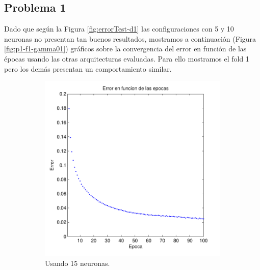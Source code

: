 \documentclass[informe.tex]{subfiles}
\begin{document}
    \newpage
    \subsection{Problema 1}
      
      Dado que según la Figura \ref{fig:errorTest-d1} las configuraciones con 5 y 10 neuronas no presentan tan buenos resultados, mostramos a continuación (Figura \ref{fig:p1-f1-gamma01}) gráficos sobre la convergencia del error en función de las épocas usando las otras arquitecturas evaluadas. Para ello mostramos el fold 1 pero los demás presentan un comportamiento similar.
      
      \FloatBarrier
      \begin{figure}[H]
        \centering
        \begin{subfigure}[b]{0.32\textwidth}
                \includegraphics[width=\textwidth]{graficos/error_fold1_15_binary_100_01.pdf}
                \caption{Usando 15 neuronas.}
                \label{fig:d1-f1-01-n15}
        \end{subfigure}
        \begin{subfigure}[b]{0.32\textwidth}

\end{subfigure}
\end{figure}
\end{document}
